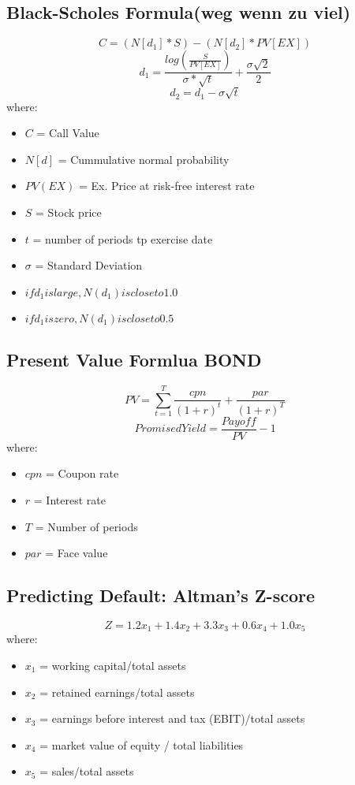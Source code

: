 \documentclass{cheatsheet}
\begin{document}
\subsection{Black-Scholes Formula(weg wenn zu viel)}
\[C = (N[d_1] * S) - (N[d_2] * PV[EX])\]
\[d_1 = \frac{log(\frac{S}{PV[EX]})}{\sigma *\sqrt{t}} + \frac{\sigma\sqrt{2}}{2}\]
\[d_2 = d_1 - \sigma\sqrt{t}\]
\noindent where:
\begin{itemize}
  \item $C$ = Call Value
  \item $N[d]$ = Cummulative normal probability
  \item $PV(EX)$ = Ex. Price at risk-free interest rate
  \item $S$ = Stock price
  \item $t$ = number of periods tp exercise date
  \item $\sigma$ = Standard Deviation 
  \item $if d_1 is large, N(d_1) is close to 1.0$
  \item $if d_1 is zero, N(d_1) is close to 0.5$
\end{itemize}
\subsection{Present Value Formlua BOND}
\[PV = \sum_{t=1}^{T}\frac{cpn}{(1+r)^{t}}+\frac{par}{(1+r)^{T}}\]
\[Promised Yield = \frac{Payoff}{PV} - 1\]
\noindent where:
\begin{itemize}
  \item $cpn$ = Coupon rate
  \item $r$ = Interest rate
  \item $T$ = Number of periods
  \item $par$ = Face value
\end{itemize}

\subsection{Predicting Default: Altman's Z-score}
\[Z = 1.2x_1 + 1.4x_2 + 3.3x_3 + 0.6x_4 + 1.0x_5\]
\noindent where:
\begin{itemize}
  \item $x_1$ = working capital/total assets
  \item $x_2$ = retained earnings/total assets
  \item $x_3$ = earnings before interest and tax (EBIT)/total assets
  \item $x_4$ = market value of equity / total liabilities
  \item $x_5$ = sales/total assets
\end{itemize}
\end{document}

